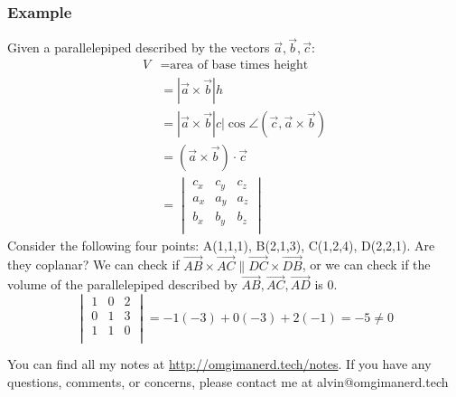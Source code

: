 \documentclass[letterpaper, 12pt]{math}
\begin{document}
\subsubsection*{Example}
Given a parallelepiped described by the vectors \( \vec{a},\vec{b},\vec{c} \):
\begin{align*}
V &= \text{area of base times height} \\
  &= |\vec{a}\times\vec{b}|h \\
  &= |\vec{a}\times\vec{b}|c|\cos\angle(\vec{c},\vec{a}\times\vec{b}) \\
  &= (\vec{a}\times\vec{b})\cdot\vec{c} \\
  &= \begin{vmatrix}
  c_{x} & c_{y} & c_{z} \\
  a_{x} & a_{y} & a_{z} \\
  b_{x} & b_{y} & b_{z} \\
  \end{vmatrix}
\end{align*}
Consider the following four points: A(1,1,1), B(2,1,3), C(1,2,4), D(2,2,1). Are
they coplanar? We can check if \( \vec{AB}\times\vec{AC}\parallel
\vec{DC}\times\vec{DB} \), or we can check if the volume of the parallelepiped
described by \( \vec{AB},\vec{AC},\vec{AD} \) is 0.
\[ \begin{vmatrix}
  1 & 0 & 2 \\
  0 & 1 & 3 \\
  1 & 1 & 0 \\
\end{vmatrix} = -1(-3)+0(-3)+2(-1) = -5 \ne 0 \]

\begin{center}
  You can find all my notes at \url{http://omgimanerd.tech/notes}. If you have
  any questions, comments, or concerns, please contact me at
  alvin@omgimanerd.tech
\end{center}
\end{document}
